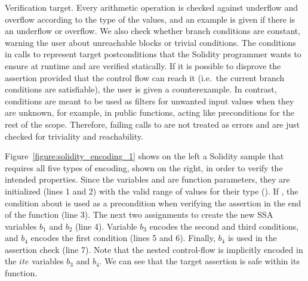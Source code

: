 \begin{paragraph}{Verification target.}
Every arithmetic operation is checked against underflow and overflow according
to the type of the values, and an example is given if there is an underflow or
overflow.
%
We also check whether branch conditions are constant, warning the user about
unreachable blocks or trivial conditions.
%
The conditions in calls to  represent target postconditions that the
Solidity programmer wants to ensure at runtime and are verified statically.
%
If it is possible to disprove the assertion provided that the control flow
can reach it (i.e.\ the current branch conditions are satisfiable),
the user is given a counterexample.
%
In contrast,  conditions are meant to be used as filters for
unwanted input values when they are unknown, for example, in public functions,
acting like preconditions for the rest of the scope.
%
Therefore, failing calls to  are not treated as errors and are
just checked for triviality and reachability.
\end{paragraph}

Figure~\ref{figure:solidity_encoding_1} shows on the left a Solidity sample
that requires all five types of encoding, shown on the right, in order to
verify the intended properties.
%
Since the variables  and  are function
parameters, they are initialized (lines 1 and 2) with the valid range of values
for their type ().
%
If , the  condition about  is used as a
precondition when verifying the assertion in the end of the function (line 3).
%
The next two assignments to  create the new SSA variables
$b_1$ and $b_2$ (line 4).
%
Variable $b_3$ encodes the second and third conditions, and $b_4$
encodes the first condition (lines 5 and 6).
%
Finally, $b_4$ is used in the assertion check (line 7).
%
Note that the nested control-flow is implicitly encoded in the $ite$
variables $b_3$ and $b_4$.
%
We can see that the target assertion is safe within its function.

